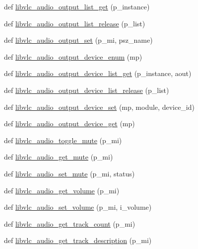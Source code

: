 \begin{DoxyCompactItemize}
\item 
def \hyperlink{namespacevlc_a8261ae46b9414ab68671c6c9d2799d47}{libvlc\+\_\+audio\+\_\+output\+\_\+list\+\_\+get} (p\+\_\+instance)
\item 
def \hyperlink{namespacevlc_aa3a70d05c0ceda7ef8abf29e5f0237bc}{libvlc\+\_\+audio\+\_\+output\+\_\+list\+\_\+release} (p\+\_\+list)
\item 
def \hyperlink{namespacevlc_a78552faa46d9cfa68ff163224b9a5c40}{libvlc\+\_\+audio\+\_\+output\+\_\+set} (p\+\_\+mi, psz\+\_\+name)
\item 
def \hyperlink{namespacevlc_ad0eaa466313964c4c8f8fca0cdb4dc03}{libvlc\+\_\+audio\+\_\+output\+\_\+device\+\_\+enum} (mp)
\item 
def \hyperlink{namespacevlc_a398beca7c466c6dee8cf8f97dec6664e}{libvlc\+\_\+audio\+\_\+output\+\_\+device\+\_\+list\+\_\+get} (p\+\_\+instance, aout)
\item 
def \hyperlink{namespacevlc_a0bab07db85d9932daaa7f9bd017702eb}{libvlc\+\_\+audio\+\_\+output\+\_\+device\+\_\+list\+\_\+release} (p\+\_\+list)
\item 
def \hyperlink{namespacevlc_a25b3f026d49515a2d0ae0906495c5fcb}{libvlc\+\_\+audio\+\_\+output\+\_\+device\+\_\+set} (mp, module, device\+\_\+id)
\item 
def \hyperlink{namespacevlc_a5b5babcb373f2af5cfa81ff75f932192}{libvlc\+\_\+audio\+\_\+output\+\_\+device\+\_\+get} (mp)
\item 
def \hyperlink{namespacevlc_ad72cfaafb813c822567cc1a8fcfc8429}{libvlc\+\_\+audio\+\_\+toggle\+\_\+mute} (p\+\_\+mi)
\item 
def \hyperlink{namespacevlc_a4cdfbd29f8712d56aed3fa83b76a1b56}{libvlc\+\_\+audio\+\_\+get\+\_\+mute} (p\+\_\+mi)
\item 
def \hyperlink{namespacevlc_a76eac9d168adc4bab5d64c0e08e0333c}{libvlc\+\_\+audio\+\_\+set\+\_\+mute} (p\+\_\+mi, status)
\item 
def \hyperlink{namespacevlc_a5bd4ab471d93bb2285affbfb6b865010}{libvlc\+\_\+audio\+\_\+get\+\_\+volume} (p\+\_\+mi)
\item 
def \hyperlink{namespacevlc_a29afce2ad9d6cc26546b735653fe67b7}{libvlc\+\_\+audio\+\_\+set\+\_\+volume} (p\+\_\+mi, i\+\_\+volume)
\item 
def \hyperlink{namespacevlc_a7a1549dd2aa2d4cbd98a3fcc8da9cb09}{libvlc\+\_\+audio\+\_\+get\+\_\+track\+\_\+count} (p\+\_\+mi)
\item 
def \hyperlink{namespacevlc_aeef886dffdb2d28ef62fb5a2314c69b3}{libvlc\+\_\+audio\+\_\+get\+\_\+track\+\_\+description} (p\+\_\+mi)

\end{DoxyCompactItemize}
